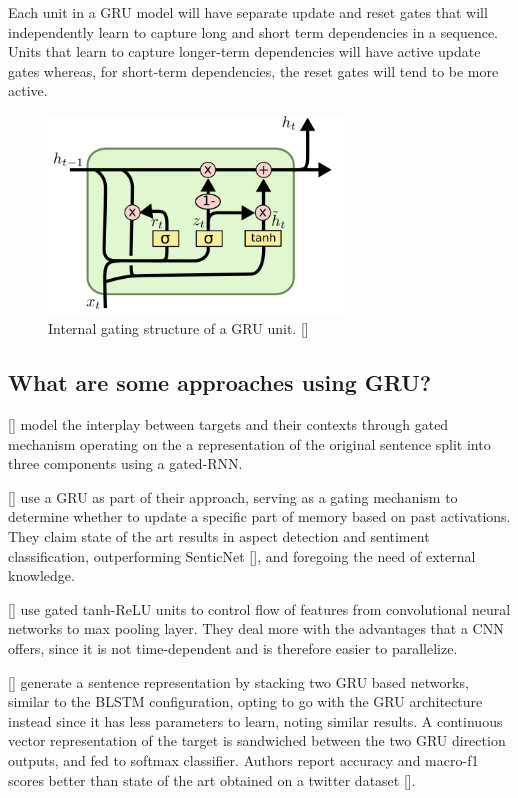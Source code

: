 \documentclass[12pt, a4paper]{report}
\theoremstyle{definition}
\theoremstyle{definition}%
\theoremstyle{definition}%
\theoremstyle{definition}%
\theoremstyle{definition}%
\theoremstyle{definition}%
\renewcommand{\cite}[1]{[\citealp{#1}]}
\begin{document}
Each unit in a GRU model will have separate update and reset gates that will independently learn to capture long and short term dependencies in a sequence. Units that learn to capture longer-term dependencies will have active update gates whereas, for short-term dependencies, the reset gates will tend to be more active.

\begin{figure}[!ht]
    \centering
    \includegraphics[width=0.7\textwidth]{fyp_template/figures/gru_architecture.png}
    \caption{Internal gating structure of a GRU unit. \cite{colah-understanding-lstm}}
    \label{fig:gru_architecture}
\end{figure}

\subsection{What are some approaches using GRU?}
\cite{zhang2016} model the interplay between targets and their contexts through gated mechanism operating on the a representation of the original sentence split into three components using a gated-RNN.  

\cite{liu2018} use a GRU as part of their approach, serving as a gating mechanism to determine whether to update a specific part of memory based on past activations. They claim state of the art results in aspect detection and sentiment classification, outperforming SenticNet \cite{ma2018}, and foregoing the need of external knowledge.

\cite{xue2018} use gated tanh-ReLU units to control flow of features from convolutional neural networks to max pooling layer. They deal more with the advantages that a CNN offers, since it is not time-dependent and is therefore easier to parallelize. 

\cite{jabreel2017} generate a sentence representation by stacking two GRU based networks, similar to the BLSTM configuration, opting to go with the GRU architecture instead since it has less parameters to learn, noting similar results. A continuous vector representation of the target is sandwiched between the two GRU direction outputs, and fed to softmax classifier. Authors report accuracy and macro-f1 scores better than state of the art obtained on a twitter dataset \cite{dong}.
\end{document}
